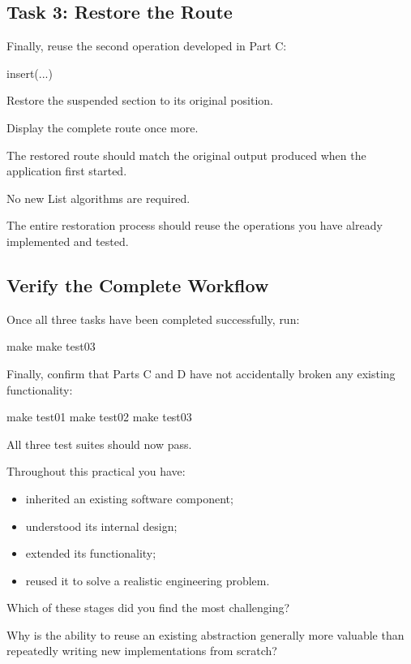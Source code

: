 \documentclass{csc2059practical}
\begin{document}
\subsection{Task 3: Restore the Route}

Finally, reuse the second operation developed in Part C:

\begin{cppcode}
insert(...)
\end{cppcode}

Restore the suspended section to its original position.

Display the complete route once more.

The restored route should match the original output produced when the application first started.

\begin{importantnote}
No new List algorithms are required.

The entire restoration process should reuse the operations you have already implemented and tested.
\end{importantnote}




\subsection{Verify the Complete Workflow}

Once all three tasks have been completed successfully, run:

\begin{terminal}
make
make test03
\end{terminal}

Finally, confirm that Parts C and D have not accidentally broken any existing functionality:

\begin{terminal}
make test01
make test02
make test03
\end{terminal}

All three test suites should now pass.




\begin{reflectionbox}

Throughout this practical you have:

\begin{itemize}
    \item inherited an existing software component;
    \item understood its internal design;
    \item extended its functionality;
    \item reused it to solve a realistic engineering problem.
\end{itemize}

Which of these stages did you find the most challenging?

Why is the ability to reuse an existing abstraction generally more valuable than repeatedly writing new implementations from scratch?

\end{reflectionbox}
\end{document}

